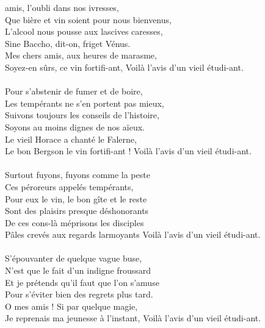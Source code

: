 
 amis, l'oubli dans nos ivresses,
\\Que bière et vin soient pour nous bienvenus,
\\L'alcool nous pousse aux lascives caresses,
\\Sine Baccho, dit-on, friget Vénus.
\\Mes chers amis, aux heures de marasme,
\\Soyez-en sûrs, ce vin fortifi-ant,
{Voilà l'avis d'un vieil étudi-ant. }
\\\\Pour s'abstenir de fumer et de boire,
\\Les tempérants ne s'en portent pas mieux,
\\Suivons toujours les conseils de l'histoire,
\\Soyons au moins dignes de nos aïeux.
\\Le vieil Horace a chanté le Falerne,
\\Le bon Bergson le vin fortifi-ant !
{Voilà l'avis d'un vieil étudi-ant. }
\\\\Surtout fuyons, fuyons comme la peste
\\Ces péroreurs appelés tempérants,
\\Pour eux le vin, le bon gîte et le reste
\\Sont des plaisirs presque déshonorants
\\De ces cons-là méprisons les disciples
\\Pâles crevés aux regards larmoyants 
{Voilà l'avis d'un vieil étudi-ant.}
\\\\S'épouvanter de quelque vague buse,
\\N'est que le fait d'un indigne froussard
\\Et je prétends qu'il faut que l'on s'amuse
\\Pour s'éviter bien des regrets plus tard.
\\O mes amis ! Si par quelque magie,
\\Je reprenais ma jeunesse à l'instant,
{Voilà l'avis d'un vieil étudi-ant. }

\breakpage